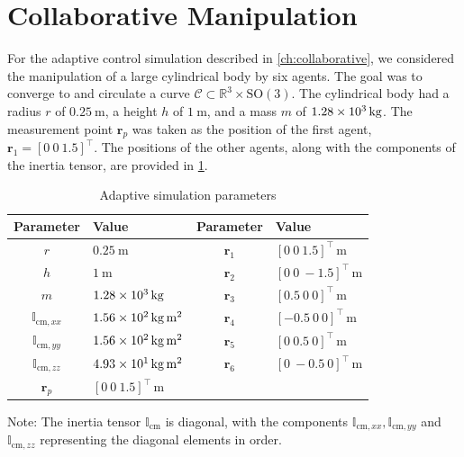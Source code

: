 \section{Collaborative Manipulation}
For the adaptive control simulation described in \cref{ch:collaborative}, we considered the manipulation of a large cylindrical body by six agents. The goal was to converge to and circulate a curve $\mathcal{C}\subset\mathbb{R}^3\times\text{SO}(3)$. The cylindrical body had a radius $r$ of $\qty{0.25}{\meter}$, a height $h$ of $\qty{1}{\meter}$, and a mass $m$ of $\qty{1.28E3}{\kilogram}$. The measurement point $\mathbf{r}_p$ was taken as the position of the first agent, $\mathbf{r}_1=[0\ 0\ 1.5]^\top$. The positions of the other agents, along with the components of the inertia tensor, are provided in \cref{tb:parameters}.
\begin{table}[htb]
    \centering
    \begin{threeparttable}
    \caption{Adaptive simulation parameters}\label{tb:parameters}
    \begin{tabular}{clcl}
    Parameter & Value & Parameter & Value\\\hline
    $r$ & $\qty{0.25}{\meter}$ & $\mathbf{r}_{1}$ & $[0\ 0\ 1.5]^\top\,\unit{\meter}$\\
    $h$ & $\qty{1}{\meter}$ & $\mathbf{r}_{2}$ & $[0\ 0\ -1.5]^\top\,\unit{\meter}$\\
    $m$ & $\qty{1.28E3}{\kilogram}$ & 
    $\mathbf{r}_{3}$ & $[0.5\ 0\ 0]^\top\,\unit{\meter}$\\
    $\mathbb{I}_{\text{cm}, xx}$ & $\qty{1.56E2}{\kilogram\meter\squared}$ & 
    $\mathbf{r}_{4}$ & $[-0.5\ 0\ 0]^\top\,\unit{\meter}$\\  
    $\mathbb{I}_{\text{cm}, yy}$ & $\qty{1.56E2}{\kilogram\meter\squared}$ &
    $\mathbf{r}_{5}$ & $[0\ 0.5\ 0]^\top\,\unit{\meter}$\\
    $\mathbb{I}_{\text{cm}, zz}$ & $\qty{4.93E1}{\kilogram\meter\squared}$  & 
    $\mathbf{r}_{6}$ & $[0\ -0.5 \ 0]^\top\,\unit{\meter}$\\
    $\mathbf{r}_{p}$ & $[0\ 0\ 1.5]^\top\,\unit{\meter}$ \\\hline
    \end{tabular}
    \begin{tablenotes}
        \footnotesize
        \item Note: The inertia tensor $\mathbb{I}_\text{cm}$ is diagonal, with the components $\mathbb{I}_{\text{cm}, xx}, \mathbb{I}_{\text{cm}, yy}$ and $\mathbb{I}_{\text{cm}, zz}$ representing the diagonal elements in order.
    \end{tablenotes}
    \end{threeparttable}
\end{table}

